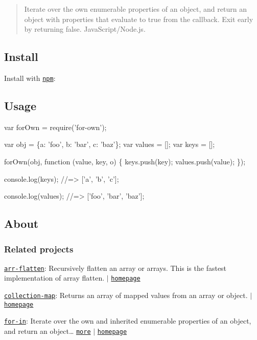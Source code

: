 \begin{quote}
Iterate over the own enumerable properties of an object, and return an object with properties that evaluate to true from the callback. Exit early by returning {\ttfamily false}. Java\+Script/\+Node.\+js. \end{quote}


\subsection*{Install}

Install with \href{https://www.npmjs.com/}{\tt npm}\+:




\subsection*{Usage}


\begin{DoxyCode}
var forOwn = require('for-own');

var obj = \{a: 'foo', b: 'bar', c: 'baz'\};
var values = [];
var keys = [];

forOwn(obj, function (value, key, o) \{
  keys.push(key);
  values.push(value);
\});

console.log(keys);
//=> ['a', 'b', 'c'];

console.log(values);
//=> ['foo', 'bar', 'baz'];
\end{DoxyCode}


\subsection*{About}

\subsubsection*{Related projects}


\begin{DoxyItemize}
\item \href{https://www.npmjs.com/package/arr-flatten}{\tt arr-\/flatten}\+: Recursively flatten an array or arrays. This is the fastest implementation of array flatten. $\vert$ \href{https://github.com/jonschlinkert/arr-flatten}{\tt homepage}
\item \href{https://www.npmjs.com/package/collection-map}{\tt collection-\/map}\+: Returns an array of mapped values from an array or object. $\vert$ \href{https://github.com/jonschlinkert/collection-map}{\tt homepage}
\item \href{https://www.npmjs.com/package/for-in}{\tt for-\/in}\+: Iterate over the own and inherited enumerable properties of an object, and return an object… \href{https://github.com/jonschlinkert/for-in}{\tt more} $\vert$ \href{https://github.com/jonschlinkert/for-in}{\tt homepage}
\end{DoxyItemize}


